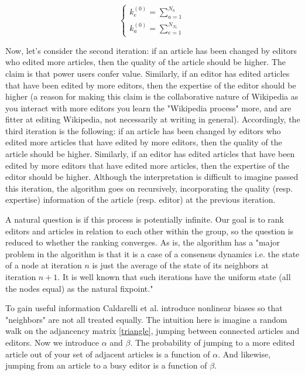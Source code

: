 \begin{equation}
\begin{cases}
 k_{e}^{(0)} = \sum_{a=1}^{N_{a}}\\
 k_{a}^{(0)} = \sum_{e=1}^{N_{N_{e}}}
\end{cases}
\end{equation}

Now, let's consider the second iteration:  if an article has been changed by editors who edited more articles, then the quality of the article should be higher. The claim is that power users confer value. Similarly, if an editor has edited articles that have been edited by more editors, then the expertise of the editor should be higher (a reason for making this claim is the collaborative nature of Wikipedia as you interact with more editors you learn the "Wikipedia process" more, and are fitter at editing Wikipedia, not necessarily at writing in general). Accordingly, the third iteration is the following: if an article has been changed by editors who edited more articles that have edited by more editors, then the quality of the article should be higher. Similarly, if an editor has edited articles that have been edited by more editors that have edited more articles, then the expertise of the editor should be higher. Although the interpretation is difficult to imagine passed this iteration, the algorithm goes on recursively, incorporating the quality (resp. expertise) information of the article (resp. editor) at the previous iteration.

A natural question is if this process is potentially infinite. Our goal is to rank editors and articles in relation to each other within the group, so the question is reduced to whether the ranking converges. As is, the algorithm
has a "major problem in the algorithm is that it is a case of a
consensus dynamics i.e. the state of a node at iteration $n$ is just
the average of the state of its neighbors at iteration $n+1$. It is well
known that such iterations have the uniform state (all the nodes
equal) as the natural fixpoint." \cite{caldarelli2012network}

To gain useful information Caldarelli et al. introduce nonlinear biases so that "neighbors" are not all treated equally. The intuition here is imagine a random walk on the adjancency matrix \ref{triangle}, jumping between connected articles and editors. Now we introduce $\alpha$ and $\beta$. The probability of jumping to a more edited article out of your set of adjacent articles is a function of $\alpha$. And likewise, jumping from an article to a busy editor is a function of $\beta$.

